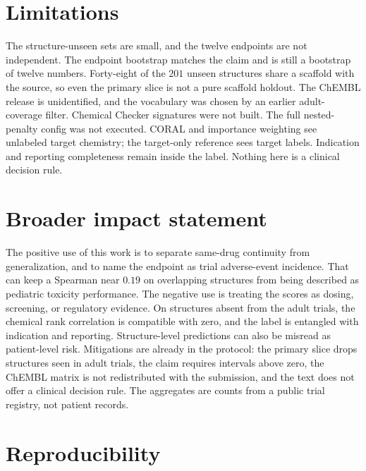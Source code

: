 \documentclass[10pt]{article}
\begin{document}
\section{Limitations}
\label{sec:limits}

The structure-unseen sets are small, and the twelve endpoints are not independent.
The endpoint bootstrap matches the claim and is still a bootstrap of twelve numbers.
Forty-eight of the $201$ unseen structures share a scaffold with the source, so even the primary slice is not a pure scaffold holdout.
The ChEMBL release is unidentified, and the vocabulary was chosen by an earlier adult-coverage filter.
Chemical Checker signatures were not built.
The full nested-penalty config was not executed.
CORAL and importance weighting see unlabeled target chemistry; the target-only reference sees target labels.
Indication and reporting completeness remain inside the label.
Nothing here is a clinical decision rule.

\section*{Broader impact statement}

The positive use of this work is to separate same-drug continuity from generalization, and to name the endpoint as trial adverse-event incidence.
That can keep a Spearman near $0.19$ on overlapping structures from being described as pediatric toxicity performance.
The negative use is treating the scores as dosing, screening, or regulatory evidence.
On structures absent from the adult trials, the chemical rank correlation is compatible with zero, and the label is entangled with indication and reporting.
Structure-level predictions can also be misread as patient-level risk.
Mitigations are already in the protocol: the primary slice drops structures seen in adult trials, the claim requires intervals above zero, the ChEMBL matrix is not redistributed with the submission, and the text does not offer a clinical decision rule.
The aggregates are counts from a public trial registry, not patient records.

\section*{Reproducibility}
\end{document}
